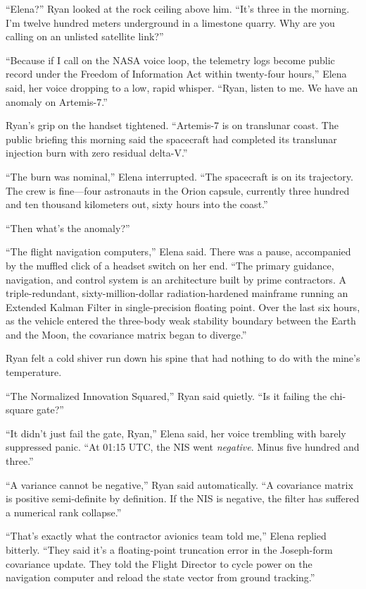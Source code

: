 \documentclass[12pt,twoside,openright]{book}
\begin{document}
``Elena?'' Ryan looked at the rock ceiling above him. ``It's three in
the morning. I'm twelve hundred meters underground in a limestone
quarry. Why are you calling on an unlisted satellite link?''

``Because if I call on the NASA voice loop, the telemetry logs become
public record under the Freedom of Information Act within twenty-four
hours,'' Elena said, her voice dropping to a low, rapid whisper. ``Ryan,
listen to me. We have an anomaly on Artemis-7.''

Ryan's grip on the handset tightened. ``Artemis-7 is on translunar
coast. The public briefing this morning said the spacecraft had
completed its translunar injection burn with zero residual delta-V.''

``The burn was nominal,'' Elena interrupted. ``The spacecraft is on its
trajectory. The crew is fine---four astronauts in the Orion capsule,
currently three hundred and ten thousand kilometers out, sixty hours
into the coast.''

``Then what's the anomaly?''

``The flight navigation computers,'' Elena said. There was a pause,
accompanied by the muffled click of a headset switch on her end. ``The
primary guidance, navigation, and control system is an architecture
built by prime contractors. A triple-redundant, sixty-million-dollar
radiation-hardened mainframe running an Extended Kalman Filter in
single-precision floating point. Over the last six hours, as the vehicle
entered the three-body weak stability boundary between the Earth and the
Moon, the covariance matrix began to diverge.''

Ryan felt a cold shiver run down his spine that had nothing to do with
the mine's temperature.

``The Normalized Innovation Squared,'' Ryan said quietly. ``Is it
failing the chi-square gate?''

``It didn't just fail the gate, Ryan,'' Elena said, her voice trembling
with barely suppressed panic. ``At 01:15 UTC, the NIS went
\emph{negative}. Minus five hundred and three.''

``A variance cannot be negative,'' Ryan said automatically. ``A
covariance matrix is positive semi-definite by definition. If the NIS is
negative, the filter has suffered a numerical rank collapse.''

``That's exactly what the contractor avionics team told me,'' Elena
replied bitterly. ``They said it's a floating-point truncation error in
the Joseph-form covariance update. They told the Flight Director to
cycle power on the navigation computer and reload the state vector from
ground tracking.''
\end{document}
